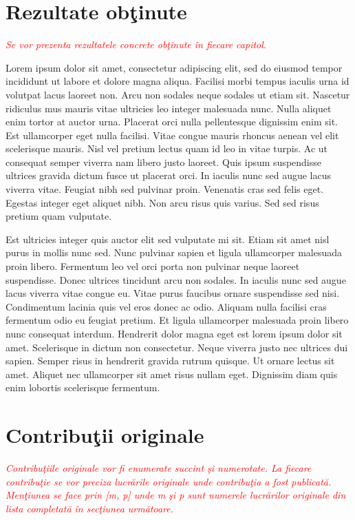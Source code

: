 \section{Rezultate ob\c{t}inute}

\textcolor{red}{\emph{Se vor prezenta rezultatele concrete ob\c{t}inute în fiecare capitol.}}

Lorem ipsum dolor sit amet, consectetur adipiscing elit, sed do eiusmod tempor incididunt ut labore et dolore magna aliqua. Facilisi morbi tempus iaculis urna id volutpat lacus laoreet non. Arcu non sodales neque sodales ut etiam sit. Nascetur ridiculus mus mauris vitae ultricies leo integer malesuada nunc. Nulla aliquet enim tortor at auctor urna. Placerat orci nulla pellentesque dignissim enim sit. Est ullamcorper eget nulla facilisi. Vitae congue mauris rhoncus aenean vel elit scelerisque mauris. Nisl vel pretium lectus quam id leo in vitae turpis. Ac ut consequat semper viverra nam libero justo laoreet. Quis ipsum suspendisse ultrices gravida dictum fusce ut placerat orci. In iaculis nunc sed augue lacus viverra vitae. Feugiat nibh sed pulvinar proin. Venenatis cras sed felis eget. Egestas integer eget aliquet nibh. Non arcu risus quis varius. Sed sed risus pretium quam vulputate.

Est ultricies integer quis auctor elit sed vulputate mi sit. Etiam sit amet nisl purus in mollis nunc sed. Nunc pulvinar sapien et ligula ullamcorper malesuada proin libero. Fermentum leo vel orci porta non pulvinar neque laoreet suspendisse. Donec ultrices tincidunt arcu non sodales. In iaculis nunc sed augue lacus viverra vitae congue eu. Vitae purus faucibus ornare suspendisse sed nisi. Condimentum lacinia quis vel eros donec ac odio. Aliquam nulla facilisi cras fermentum odio eu feugiat pretium. Et ligula ullamcorper malesuada proin libero nunc consequat interdum. Hendrerit dolor magna eget est lorem ipsum dolor sit amet. Scelerisque in dictum non consectetur. Neque viverra justo nec ultrices dui sapien. Semper risus in hendrerit gravida rutrum quisque. Ut ornare lectus sit amet. Aliquet nec ullamcorper sit amet risus nullam eget. Dignissim diam quis enim lobortis scelerisque fermentum.


\section{Contribu\c{t}ii originale}

\textcolor{red}{\emph{Contribuţiile originale vor fi enumerate succint şi numerotate. La fiecare contribuţie se vor preciza lucrările originale unde contribuţia a fost publicată. Menţiunea se face prin [m, p] unde m \c{s}i p sunt numerele lucrărilor originale din lista completată în secţiunea următoare.}}

